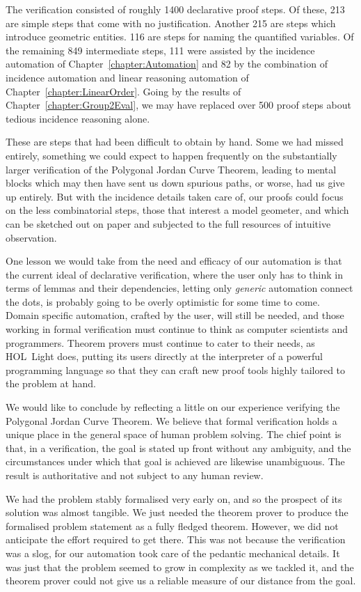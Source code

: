 The verification consisted of roughly 1400 declarative proof steps. Of these, 213 are simple  steps that come with no justification. Another 215 are  steps which introduce geometric entities. 116 are  steps for naming the quantified variables. Of the remaining 849 intermediate steps, 111 were assisted by the incidence automation of Chapter~\ref{chapter:Automation} and 82 by the combination of incidence automation and linear reasoning automation of Chapter~\ref{chapter:LinearOrder}. Going by the results of Chapter~\ref{chapter:Group2Eval}, we may have replaced over 500 proof steps about tedious incidence reasoning alone.

These are steps that had been difficult to obtain by hand. Some we had missed entirely, something we could expect to happen frequently on the substantially larger verification of the Polygonal Jordan Curve Theorem, leading to mental blocks which may then have sent us down spurious paths, or worse, had us give up entirely. But with the incidence details taken care of, our proofs could focus on the less combinatorial steps, those that interest a model geometer, and which can be sketched out on paper and subjected to the full resources of intuitive observation.

One lesson we would take from the need and efficacy of our automation is that the current ideal of declarative verification, where the user only has to think in terms of lemmas and their dependencies, letting only \emph{generic} automation connect the dots, is probably going to be overly optimistic for some time to come. Domain specific automation, crafted by the user, will still be needed, and those working in formal verification must continue to think as computer scientists and programmers. Theorem provers must continue to cater to their needs, as HOL~Light does, putting its users directly at the interpreter of a powerful programming language so that they can craft new proof tools highly tailored to the problem at hand.

We would like to conclude by reflecting a little on our experience verifying the Polygonal Jordan Curve Theorem. We believe that formal verification holds a unique place in the general space of human problem solving. The chief point is that, in a verification, the goal is stated up front without any ambiguity, and the circumstances under which that goal is achieved are likewise unambiguous. The result is authoritative and not subject to any human review. 

We had the problem stably formalised very early on, and so the prospect of its solution was almost tangible. We just needed the theorem prover to produce the formalised problem statement as a fully fledged theorem. However, we did not anticipate the effort required to get there. This was not because the verification was a slog, for our automation took care of the pedantic mechanical details. It was just that the problem seemed to grow in complexity as we tackled it, and the theorem prover could not give us a reliable measure of our distance from the goal.

